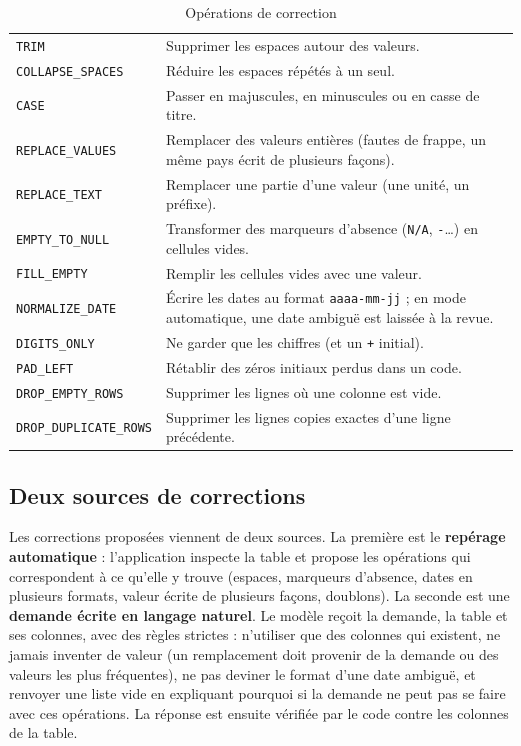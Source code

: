 \begin{table}[H]
\centering
\small
\begin{tabular}{|L{3.8cm}|L{10.2cm}|}
\hline
{} &  \\ \hline
\texttt{TRIM} & Supprimer les espaces autour des valeurs. \\ \hline
\texttt{COLLAPSE\_SPACES} & Réduire les espaces répétés à un seul. \\ \hline
\texttt{CASE} & Passer en majuscules, en minuscules ou en casse de titre. \\ \hline
\texttt{REPLACE\_VALUES} & Remplacer des valeurs entières (fautes de frappe, un même pays écrit de plusieurs façons). \\ \hline
\texttt{REPLACE\_TEXT} & Remplacer une partie d'une valeur (une unité, un préfixe). \\ \hline
\texttt{EMPTY\_TO\_NULL} & Transformer des marqueurs d'absence (\texttt{N/A}, \texttt{-}\ldots) en cellules vides. \\ \hline
\texttt{FILL\_EMPTY} & Remplir les cellules vides avec une valeur. \\ \hline
\texttt{NORMALIZE\_DATE} & Écrire les dates au format \texttt{aaaa-mm-jj} ; en mode automatique, une date ambiguë est laissée à la revue. \\ \hline
\texttt{DIGITS\_ONLY} & Ne garder que les chiffres (et un \texttt{+} initial). \\ \hline
\texttt{PAD\_LEFT} & Rétablir des zéros initiaux perdus dans un code. \\ \hline
\texttt{DROP\_EMPTY\_ROWS} & Supprimer les lignes où une colonne est vide. \\ \hline
\texttt{DROP\_DUPLICATE\_ROWS} & Supprimer les lignes copies exactes d'une ligne précédente. \\ \hline
\end{tabular}
\caption{Opérations de correction}
\label{tab:operations}
\end{table}

\subsection{Deux sources de corrections}

Les corrections proposées viennent de deux sources. La première est le \textbf{repérage automatique} : l'application inspecte la table et propose les opérations qui correspondent à ce qu'elle y trouve (espaces, marqueurs d'absence, dates en plusieurs formats, valeur écrite de plusieurs façons, doublons). La seconde est une \textbf{demande écrite en langage naturel}. Le modèle reçoit la demande, la table et ses colonnes, avec des règles strictes : n'utiliser que des colonnes qui existent, ne jamais inventer de valeur (un remplacement doit provenir de la demande ou des valeurs les plus fréquentes), ne pas deviner le format d'une date ambiguë, et renvoyer une liste vide en expliquant pourquoi si la demande ne peut pas se faire avec ces opérations. La réponse est ensuite vérifiée par le code contre les colonnes de la table.

